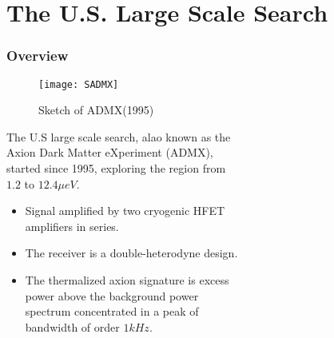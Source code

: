 \documentclass{beamer}
\begin{document}
\section{The U.S. Large Scale Search}
\begin{frame}
  \frametitle{Overview}
  \begin{wrapfigure}{l}{0.33\textwidth}
    \caption{Sketch of ADMX(1995)}
    \centering
    \texttt{[image: SADMX]}
  \end{wrapfigure}
  The U.S large scale search, alao known as the \\Axion Dark Matter eXperiment
  (ADMX), \\started since 1995, exploring the region from \\$1.2$ to $12.4\mu
  eV$.
  \begin{itemize}
  \item Signal amplified by two cryogenic HFET \\amplifiers in series.
  \item The receiver is a double-heterodyne design.
  \item The thermalized axion signature is excess \\power above the background
  power \\spectrum concentrated in a peak of \\bandwidth of order $1kHz$.
  \end{itemize}
\end{frame}
\end{document}
